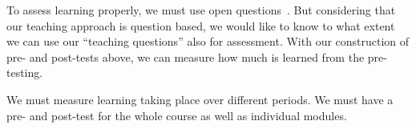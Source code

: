 To assess learning properly, we must use open 
questions~\parencite{NecessaryConditionsOfLearning}.
But considering that our teaching approach is question based, we would like to 
know to what extent we can use our \enquote{teaching questions} also for 
assessment.
With our construction of pre- and post-tests above, we can measure how much is 
learned from the pre-testing.

We must measure learning taking place over different periods.
We must have a pre- and post-test for the whole course as well as individual 
modules.

